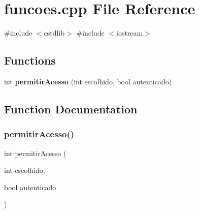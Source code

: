 \section{funcoes.\+cpp File Reference}
\label{funcoes_8cpp}
{\ttfamily \#include $<$cstdlib$>$}\newline
{\ttfamily \#include $<$iostream$>$}\newline
\subsection*{Functions}
\begin{DoxyCompactItemize}
\item 
int \textbf{ permitir\+Acesso} (int escolhido, bool autenticado)
\end{DoxyCompactItemize}


\subsection{Function Documentation}
\mbox{\label{funcoes_8cpp_aca280fa2bf44a24ebbd89c1ba785156d}} 
\subsubsection{permitir\+Acesso()}
{\footnotesize\ttfamily int permitir\+Acesso (\begin{DoxyParamCaption}\item[{int}]{escolhido,  }\item[{bool}]{autenticado }\end{DoxyParamCaption})}

